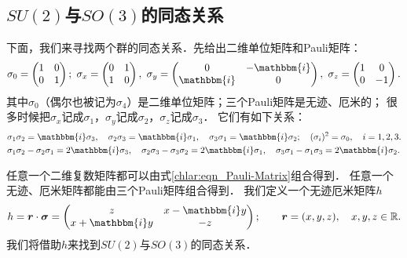 \subsection{$SU(2)$与$SO(3)$的同态关系}\label{chlar:sec_SU2-SO3}
下面，我们来寻找两个群的同态关系．先给出二维单位矩阵和Pauli矩阵：
\begin{equation}\label{chlar:eqn_Pauli-Matrix}
    \sigma_0 = \begin{pmatrix} 1 & 0 \\ 0 & 1 \end{pmatrix}; \
    \sigma_x = \begin{pmatrix} 0 & 1 \\ 1 & 0 \end{pmatrix}, \
    \sigma_y = \begin{pmatrix} 0 & -\mathbbm{i} \\ \mathbbm{i} & 0 \end{pmatrix}, \
    \sigma_z = \begin{pmatrix} 1 & 0 \\ 0 & -1 \end{pmatrix}.
\end{equation}
其中$\sigma_0$（偶尔也被记为$\sigma_4$）是二维单位矩阵；三个Pauli矩阵是无迹、厄米的；
很多时候把$\sigma_x$记成$\sigma_1$，$\sigma_y$记成$\sigma_2$，$\sigma_z$记成$\sigma_3$．
它们有如下关系：
\begin{align}
    &\sigma_1 \sigma_2 = \mathbbm{i} \sigma_3,\quad
    \sigma_2 \sigma_3 = \mathbbm{i} \sigma_1,\quad
    \sigma_3 \sigma_1 = \mathbbm{i} \sigma_2;\quad
    (\sigma_i)^2 = \sigma_0, \quad i=1,2,3. \\
    &\sigma_1 \sigma_2-\sigma_2 \sigma_1=2\mathbbm{i} \sigma_3,\quad
    \sigma_2 \sigma_3-\sigma_3 \sigma_2=2\mathbbm{i} \sigma_1,\quad
    \sigma_3 \sigma_1-\sigma_1 \sigma_3=2\mathbbm{i} \sigma_2.
\end{align}%

任意一个二维复数矩阵都可以由式\eqref{chlar:eqn_Pauli-Matrix}组合得到．
任意一个无迹、厄米矩阵都能由三个Pauli矩阵组合得到．
我们定义一个无迹厄米矩阵$h$
\begin{equation}
    h = \boldsymbol{r}\cdot \boldsymbol{\sigma}
    =\begin{pmatrix}
        z & x- \mathbbm{i} y \\ x+ \mathbbm{i} y & -z
    \end{pmatrix}; 
    \qquad \boldsymbol{r}= (x,y,z), \quad x, y, z \in \mathbb{R} .
\end{equation}
我们将借助$h$来找到$SU(2)$与$SO(3)$的同态关系．

